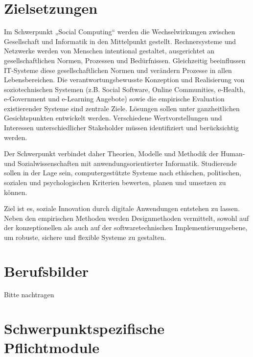 \section*{Zielsetzungen\label{/mi-2017/modulbeschreibungen-master/schwerpunkt-soziotechnische-systeme}}\label{zielsetzungenpathlabelmi-2017modulbeschreibungen-masterschwerpunkt-soziotechnische-systeme}

Im Schwerpunkt „Social Computing`` werden die Wechselwirkungen zwischen
Gesellschaft und Informatik in den Mittelpunkt gestellt. Rechnersysteme
und Netzwerke werden von Menschen intentional gestaltet, ausgerichtet an
gesellschaftlichen Normen, Prozessen und Bedürfnissen. Gleichzeitig
beeinflussen IT-Systeme diese gesellschaftlichen Normen und verändern
Prozesse in allen Lebensbereichen. Die verantwortungsbewusste Konzeption
und Realisierung von soziotechnischen Systemen (z.B. Social Software,
Online Communities, e-Health, e-Government und e-Learning Angebote)
sowie die empirische Evaluation existierender Systeme sind zentrale
Ziele. Lösungen sollen unter ganzheitlichen Gesichtspunkten entwickelt
werden. Verschiedene Wertvorstellungen und Interessen unterschiedlicher
Stakeholder müssen identifiziert und berücksichtig werden.

Der Schwerpunkt verbindet daher Theorien, Modelle und Methodik der
Human- und Sozialwissenschaften mit anwendungsorientierter Informatik.
Studierende sollen in der Lage sein, computergestützte Systeme nach
ethischen, politischen, sozialen und psychologischen Kriterien bewerten,
planen und umsetzen zu können.

Ziel ist es, soziale Innovation durch digitale Anwendungen entstehen zu
lassen. Neben den empirischen Methoden werden Designmethoden vermittelt,
sowohl auf der konzeptionellen als auch auf der softwaretechnischen
Implementierungsebene, um robuste, sichere und flexible Systeme zu
gestalten.

\section*{Berufsbilder\label{/mi-2017/modulbeschreibungen-master/schwerpunkt-soziotechnische-systeme}}\label{berufsbilderpathlabelmi-2017modulbeschreibungen-masterschwerpunkt-soziotechnische-systeme}

Bitte nachtragen

\section*{Schwerpunktspezifische
Pflichtmodule\label{/mi-2017/modulbeschreibungen-master/schwerpunkt-soziotechnische-systeme}}\label{schwerpunktspezifische-pflichtmodulepathlabelmi-2017modulbeschreibungen-masterschwerpunkt-soziotechnische-systeme}


